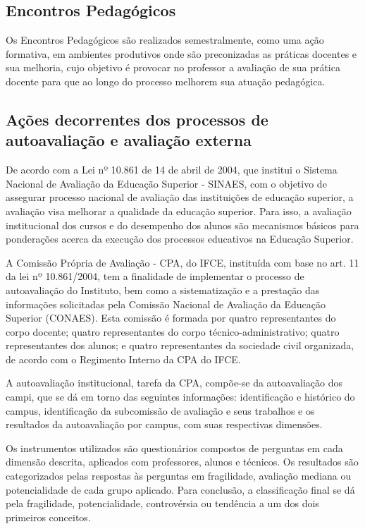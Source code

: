 \documentclass{paper}
\begin{document}
\subsection{Encontros Pedagógicos}

Os Encontros Pedagógicos são realizados semestralmente, como uma ação formativa, em ambientes produtivos onde são preconizadas as práticas docentes e sua melhoria, cujo objetivo é provocar no professor a avaliação de sua prática docente para que ao longo do processo melhorem sua atuação pedagógica.

\subsection{Ações decorrentes dos processos de autoavaliação e avaliação externa}

De acordo com a Lei nº 10.861 de 14 de abril de 2004, que institui o Sistema Nacional de Avaliação da Educação Superior - SINAES, com o objetivo de assegurar processo nacional de avaliação das instituições de educação superior, a avaliação visa melhorar a qualidade da educação superior. Para isso, a avaliação institucional dos cursos e do desempenho dos alunos são mecanismos básicos para ponderações acerca da execução dos processos educativos na Educação Superior.

A Comissão Própria de Avaliação - CPA, do IFCE, instituída com base no art. 11 da lei nº 10.861/2004, tem a finalidade de implementar o processo de autoavaliação do Instituto, bem como a sistematização e a prestação das informações solicitadas pela Comissão Nacional de Avaliação da Educação Superior (CONAES). Esta comissão é formada por quatro representantes do corpo docente; quatro representantes do corpo técnico-administrativo; quatro representantes dos alunos; e quatro representantes da sociedade civil organizada, de acordo com o Regimento Interno da CPA do IFCE.

A autoavaliação institucional, tarefa da CPA, compõe-se da autoavaliação dos campi, que se dá em torno das seguintes informações: identificação e histórico do campus, identificação da subcomissão de avaliação e seus trabalhos e os resultados da autoavaliação por campus, com suas respectivas dimensões. 

Os instrumentos utilizados são questionários compostos de perguntas em cada dimensão descrita, aplicados com professores, alunos e técnicos. Os resultados são categorizados pelas respostas às perguntas em fragilidade, avaliação mediana ou potencialidade de cada grupo aplicado. Para conclusão, a classificação final se dá pela fragilidade, potencialidade, controvérsia ou tendência a um dos dois primeiros conceitos. 
\end{document}
